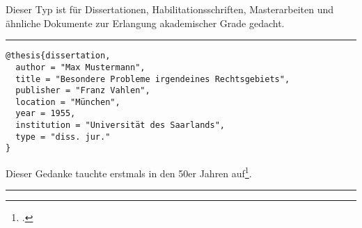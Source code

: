 \documentclass[11pt,a4paper,DIV=calc]{scrartcl}
\newenvironment{rubexample}{\par\vspace{\baselineskip}\hrule\par\begin{refsection}}{\end{refsection}\par\hrule\par\vspace{\baselineskip}}
\begin{document}
Dieser Typ ist für Dissertationen, Habilitationsschriften,
Masterarbeiten und ähnliche Dokumente zur Erlangung akademischer
Grade gedacht.

\begin{rubexample}
\begin{verbatim}
@thesis{dissertation,
  author = "Max Mustermann",
  title = "Besondere Probleme irgendeines Rechtsgebiets",
  publisher = "Franz Vahlen",
  location = "München",
  year = 1955,
  institution = "Universität des Saarlands",
  type = "diss. jur."
}
\end{verbatim}

Dieser Gedanke tauchte erstmals in den 50er Jahren
auf\footcite[123]{dissertation}.

\printbibliography
\end{rubexample}
\end{document}
